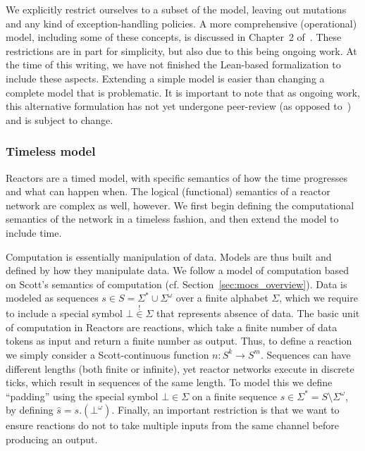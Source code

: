 We explicitly restrict ourselves to a subset of the model, leaving out mutations and any kind of exception-handling policies.
A more comprehensive (operational) model, including some of these concepts, is discussed in Chapter~2 of~\cite{lohstroh_phdthesis}.
These restrictions are in part for simplicity, but also due to this being ongoing work.
At the time of this writing, we have not finished the Lean-based formalization to include these aspects.
Extending a simple model is easier than changing a complete model that is problematic.
It is important to note that as ongoing work, this alternative formulation has not yet undergone peer-review (as opposed to~\cite{lohstroh_cyphy19}) and is subject to change.

\subsubsection{Timeless model}

Reactors are a timed model, with specific semantics of how the time progresses and what can happen when.
The logical (functional) semantics of a reactor network are complex as well, however.
We first begin defining the computational semantics of the network in a timeless fashion, and then extend the model to include time.

Computation is essentially manipulation of data.
Models are thus built and defined by how they manipulate data.
We follow a model of computation based on Scott's semantics of computation (cf. Section~\ref{sec:mocs_overview}).
Data is modeled as sequences $s \in S = \Sigma^* \cup \Sigma^\omega$ over a finite alphabet $\Sigma$, which we require to include a special symbol $\bot \overset{!}{\in} \Sigma$ that represents absence of data.
The basic unit of computation in Reactors are reactions, which take a finite number of data tokens as input and return a finite number as output.
Thus, to define a reaction we simply consider a Scott-continuous function $n : S^k \rightarrow S^m$.
Sequences can have different lengths (both finite or infinite), yet reactor networks execute in discrete ticks, which result in sequences of the same length.
To model this we define ``padding'' using the special symbol $\bot \in \Sigma$ on a finite sequence $s \in \Sigma^* = S \setminus \Sigma^\omega$, by defining $\hat s  = s.(\bot^\omega)$. 
Finally, an important restriction is that we want to ensure reactions do not to take multiple inputs from the same channel before producing an output. 


